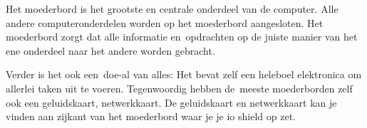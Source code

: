 Het moederbord is het grootste en centrale onderdeel van de computer. Alle andere computeronderdelen worden op het moederbord aangesloten. Het moederbord zorgt dat alle informatie en opdrachten op de juiste manier van het ene onderdeel naar het andere worden gebracht.

Verder is het ook een doe-al van alles: Het bevat zelf een heleboel elektronica om allerlei taken uit te voeren. 
Tegenwoordig hebben de meeste moederborden zelf ook een geluidskaart, netwerkkaart. De geluidskaart en netwerkkaart kan je vinden aan zijkant van het moederbord waar je je io shield op zet. 
